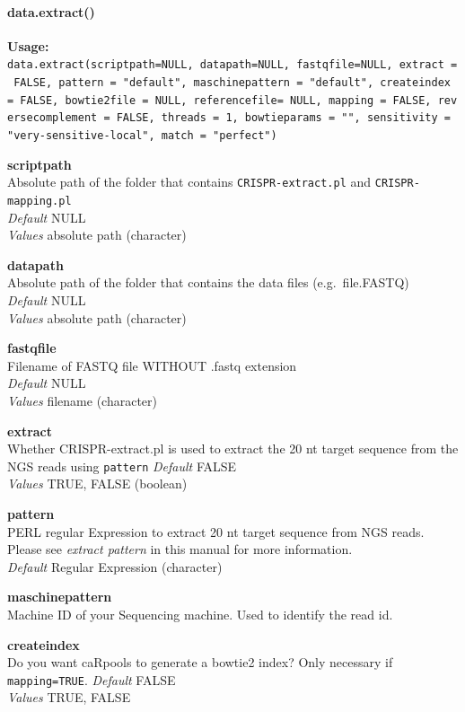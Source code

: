 \documentclass[]{article}
\let\oldparagraph\paragraph
\renewcommand{\paragraph}[1]{\oldparagraph{#1}\mbox{}}
\begin{document}
\paragraph{data.extract()}\label{data.extract}

\textbf{Usage:}\\
\texttt{data.extract(scriptpath=NULL,\ datapath=NULL,\ fastqfile=NULL,\ extract\ =\ FALSE,\ pattern\ =\ "default",\ maschinepattern\ =\ "default",\ createindex\ =\ FALSE,\ bowtie2file\ =\ NULL,\ referencefile=\ NULL,\ mapping\ =\ FALSE,\ reversecomplement\ =\ FALSE,\ threads\ =\ 1,\ bowtieparams\ =\ "",\ sensitivity\ =\ "very-sensitive-local",\ match\ =\ "perfect")}

\textbf{scriptpath}\\
Absolute path of the folder that contains \texttt{CRISPR-extract.pl} and
\texttt{CRISPR-mapping.pl}\\
\emph{Default} NULL\\
\emph{Values} absolute path (character)

\textbf{datapath}\\
Absolute path of the folder that contains the data files
(e.g.~file.FASTQ)\\
\emph{Default} NULL\\
\emph{Values} absolute path (character)

\textbf{fastqfile}\\
Filename of FASTQ file WITHOUT .fastq extension\\
\emph{Default} NULL\\
\emph{Values} filename (character)

\textbf{extract}\\
Whether CRISPR-extract.pl is used to extract the 20 nt target sequence
from the NGS reads using \texttt{pattern} \emph{Default} FALSE\\
\emph{Values} TRUE, FALSE (boolean)

\textbf{pattern}\\
PERL regular Expression to extract 20 nt target sequence from NGS reads.
Please see \emph{extract pattern} in this manual for more information.\\
\emph{Default} Regular Expression (character)

\textbf{maschinepattern}\\
Machine ID of your Sequencing machine. Used to identify the read id.

\textbf{createindex}\\
Do you want caRpools to generate a bowtie2 index? Only necessary if
\texttt{mapping=TRUE}. \emph{Default} FALSE\\
\emph{Values} TRUE, FALSE
\end{document}
